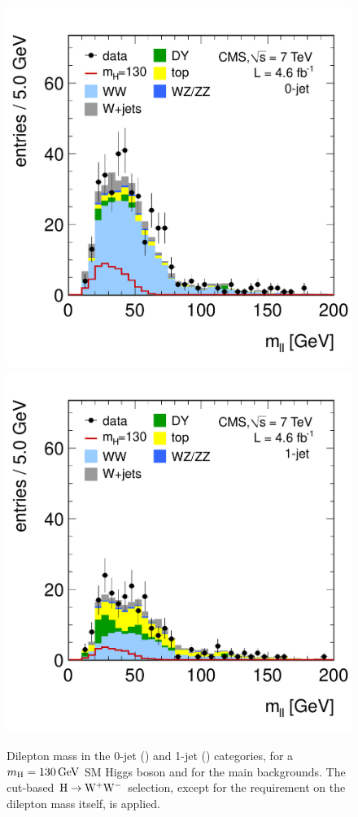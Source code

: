 \documentclass[11pt,twoside,a4paper,cmspaper,final,collab]{cms-tdr}
\begin{document}
\begin{figure}[htbp]
\begin{center}
  \includegraphics[width=\cmsFigWidth]{mll_all_lin_0j}
  \includegraphics[width=\cmsFigWidth]{mll_all_lin_1j}
	 \caption{Dilepton mass
	 in the 0-jet (\cmsLeft) and 1-jet (\cmsRight) categories,
       for a $m_{\mathrm{H}}=130\,\text{Ge\hspace{-.08em}V}$ SM Higgs boson and for the main backgrounds.
       The cut-based $\mathrm{H}\to\mathrm{W^+}{}\mathrm{W^-}$ selection, except for the requirement on the dilepton mass itself, is applied.}  \label{fig:mllHWW}
\end{center}
\end{figure}
\end{document}
